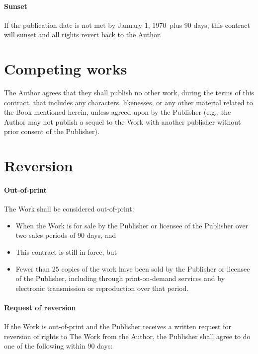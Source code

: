 \documentclass[12pt,letterpaper]{article}
\def\PublicationDate{January 1, 1970}
\begin{document}
\paragraph{Sunset}

If the publication date is not met by \PublicationDate\ plus 90 days, this contract will sunset and all rights revert back to the Author.

\section{Competing works}

The Author agrees that they shall publish no other work, during the terms of this contract, that includes any characters, likenesses, or any other material related to the Book mentioned herein, unless agreed upon by the Publisher (e.g., the Author may not publish a sequel to the Work with another publisher without prior consent of the Publisher).

\section{Reversion}

\paragraph{Out-of-print}

The Work shall be considered out-of-print:

\begin{itemize}
    \item When the Work is for sale by the Publisher or licensee of the Publisher over two sales periods of 90 days, and
    \item This contract is still in force, but
    \item Fewer than 25 copies of the work have been sold by the Publisher or licensee of the Publisher, including through print-on-demand services and by electronic transmission or reproduction over that period.
\end{itemize}

\paragraph{Request of reversion}

If the Work is out-of-print and the Publisher receives a written request for reversion of rights to The Work from the Author, the Publisher shall agree to do one of the following within 90 days:
\end{document}
